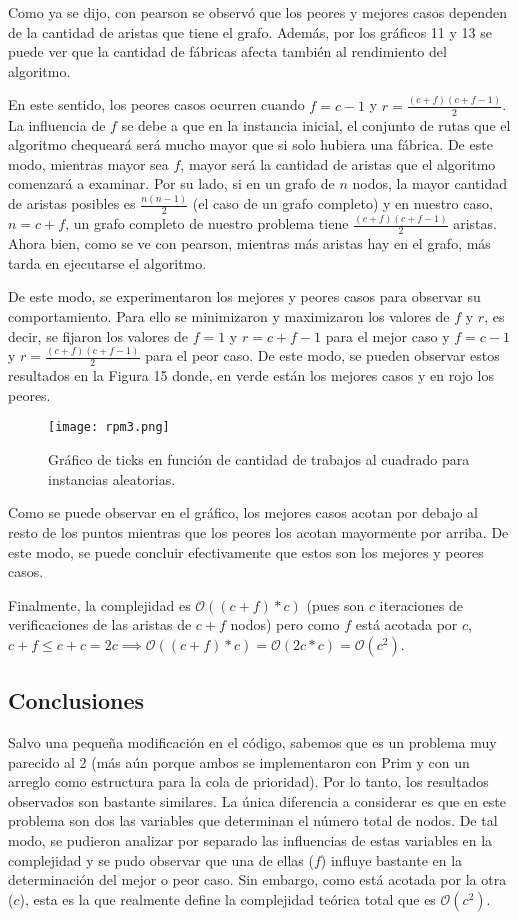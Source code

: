 \documentclass[A4paper,oneside,fleqn,11pt]{article}
\theoremstyle{definition}
\begin{document}
Como ya se dijo, con pearson se observó que los peores y mejores casos dependen de la cantidad de aristas que tiene el grafo. Además, por los gráficos 11 y 13 se puede ver que la cantidad de fábricas afecta también al rendimiento del algoritmo.

En este sentido, los peores casos ocurren cuando $f=c-1$ y $r=\frac{(c+f)(c+f-1)}{2}$. La influencia de $f$ se debe a que en la instancia inicial, el conjunto de rutas que el algoritmo chequeará será mucho mayor que si solo hubiera una fábrica. De este modo, mientras mayor sea $f$, mayor será la cantidad de aristas que el algoritmo comenzará a examinar. Por su lado, si en un grafo de $n$ nodos, la mayor cantidad de aristas posibles es $\frac{n(n-1)}{2}$ (el caso de un grafo completo) y en nuestro caso, $n=c+f$, un grafo completo de nuestro problema tiene $\frac{(c+f)(c+f-1)}{2}$ aristas. Ahora bien, como se ve con pearson, mientras más aristas hay en el grafo, más tarda en ejecutarse el algoritmo.

De este modo, se experimentaron los mejores y peores casos para observar su comportamiento. Para ello se minimizaron y maximizaron los valores de $f$ y $r$, es decir, se fijaron los valores de $f=1$ y $r=c+f-1$ para el mejor caso y $f=c-1$ y $r=\frac{(c+f)(c+f-1)}{2}$ para el peor caso. De este modo, se pueden observar estos resultados en la Figura 15 donde, en verde están los mejores casos y en rojo los peores.


\begin{figure}[h!]
\centering
\texttt{[image: rpm3.png]}
\caption{Gráfico de ticks en función de cantidad de trabajos al cuadrado para instancias aleatorias.}
\end{figure}

Como se puede observar en el gráfico, los mejores casos acotan por debajo al resto de los puntos mientras que los peores los acotan mayormente por arriba. De este modo, se puede concluir efectivamente que estos son los mejores y peores casos.

Finalmente, la complejidad es $\mathcal{O} ((c+f)*c)$ (pues son $c$ iteraciones de verificaciones de las aristas de $c+f$ nodos) pero como $f$ está acotada por $c$, $c+f \leq c+c = 2c \implies \mathcal{O} ((c+f)*c) = \mathcal{O} (2c*c) = \mathcal{O} (c^2)$.


\subsection{Conclusiones}

Salvo una pequeña modificación en el código, sabemos que es un problema muy parecido al 2 (más aún porque ambos se implementaron con Prim y con un arreglo como estructura para la cola de prioridad). Por lo tanto, los resultados observados son bastante similares. La única diferencia a considerar es que en este problema son dos las variables que determinan el número total de nodos. De tal modo, se pudieron analizar por separado las influencias de estas variables en la complejidad y se pudo observar que una de ellas ($f$) influye bastante en la determinación del mejor o peor caso. Sin embargo, como está acotada por la otra ($c$), esta es la que realmente define la complejidad teórica total que es $\mathcal{O} (c^2)$.
\end{document}
